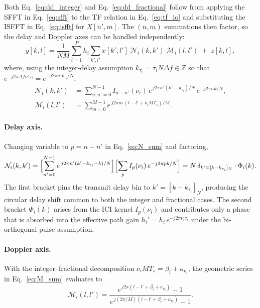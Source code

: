 \documentclass[11pt,a4paper]{article}
\newcommand{\deltaf}{\Delta f}
\begin{document}
Both Eq.~\eqref{eq:dd_integer} and Eq.~\eqref{eq:dd_fractional}
follow from applying the SFFT in Eq.~\eqref{eq:sfft} to the TF
relation in Eq.~\eqref{eq:tf_io} and substituting the ISFFT in
Eq.~\eqref{eq:isfft} for $X[n',m]$. The $(n,m)$ summations then
factor, so the delay and Doppler axes can be handled independently:
\begin{equation}
  y[k,l] = \frac{1}{NM}\sum_{i=1}^{P} h_i
  \sum_{k',l'} x[k',l']\;
  \mathcal{N}_i(k,k')\;\mathcal{M}_i(l,l') \;+\; z[k,l],
  \label{eq:dd_nm_split}
\end{equation}
where, using the integer-delay assumption
$k_{\tau_i}=\tau_i N\deltaf\in\mathbb{Z}$ so that
$e^{-j2\pi\deltaf n'\tau_i} = e^{-j2\pi n' k_{\tau_i}/N}$,
\begin{align}
  \mathcal{N}_i(k,k') &= \sum_{n,n'=0}^{N-1}
    I_{n-n'}(\nu_i)\,
    e^{\,j2\pi n'(k'-k_{\tau_i})/N}\,
    e^{-j2\pi nk/N},
    \label{eq:N_sum}\\[4pt]
  \mathcal{M}_i(l,l') &= \sum_{m=0}^{M-1}
    e^{\,j2\pi m\,(l-l'+\nu_i MT_s)/M}.
    \label{eq:M_sum}
\end{align}

\paragraph{Delay axis.}
Changing variable to $p = n-n'$ in Eq.~\eqref{eq:N_sum} and
factoring,
\begin{equation}
  \mathcal{N}_i(k,k') =
    \Bigl[\sum_{n'=0}^{N-1}
      e^{\,j2\pi n'(k'-k_{\tau_i}-k)/N}\Bigr]
    \Bigl[\sum_{p} I_p(\nu_i)\,e^{-j2\pi pk/N}\Bigr]
    = N\,\delta_{k'\equiv[k-k_{\tau_i}]_N}\cdot\Phi_i(k).
\end{equation}
The first bracket pins the transmit delay bin to
$k'=[k-k_{\tau_i}]_N$, producing the circular delay shift common to
both the integer and fractional cases. The second bracket
$\Phi_i(k)$ arises from the ICI kernel $I_p(\nu_i)$ and contributes
only a phase that is absorbed into the effective path gain
$h_i' = h_i\,e^{-j2\pi\nu_i\tau_i}$ under the bi-orthogonal pulse
assumption.

\paragraph{Doppler axis.}
With the integer--fractional decomposition
$\nu_i MT_s = \beta_i + \kappa_{\nu_i}$, the geometric series in
Eq.~\eqref{eq:M_sum} evaluates to
\begin{equation}
  \mathcal{M}_i(l,l') =
  \frac{e^{\,j2\pi(l-l'+\beta_i+\kappa_{\nu_i})}-1}
       {e^{\,j(2\pi/M)(l-l'+\beta_i+\kappa_{\nu_i})}-1}.
  \label{eq:M_closed}
\end{equation}
\end{document}
